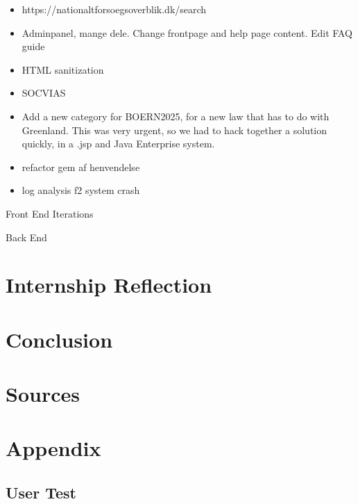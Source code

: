 \documentclass[../main.tex]{subfiles}
\begin{document}
\begin{itemize}
    \item https://nationaltforsoegsoverblik.dk/search 
    \item Adminpanel, mange dele. Change frontpage and help page content. Edit FAQ guide 
    \item HTML sanitization 
    \item SOCVIAS 
    \item Add a new category for BOERN2025, for a new law that has to do with Greenland. This was very urgent, so we had to hack together a solution quickly, in a .jsp and Java Enterprise system. 
    \item refactor gem af henvendelse
    \item log analysis f2 system crash
\end{itemize}


Front End Iterations 

Back End 

\section{Internship Reflection}


\section{Conclusion}


\section{Sources}

\section{Appendix}
\label{sec:appendix}

\subsection{User Test}
\label{sec:user_test}
\end{document}
